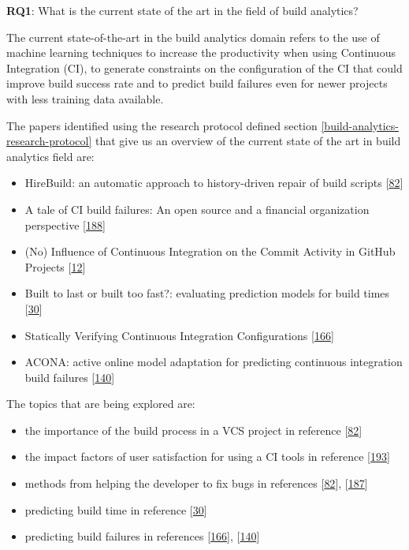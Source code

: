 \documentclass[]{book}
\providecommand{\tightlist}{%
  \setlength{\itemsep}{0pt}\setlength{\parskip}{0pt}}
\begin{document}
\textbf{RQ1}: What is the current state of the art in the field of build
analytics?

The current state-of-the-art in the build analytics domain refers to the
use of machine learning techniques to increase the productivity when
using Continuous Integration (CI), to generate constraints on the
configuration of the CI that could improve build success rate and to
predict build failures even for newer projects with less training data
available.

The papers identified using the research protocol defined section
\ref{build-analytics-research-protocol} that give us an overview of the
current state of the art in build analytics field are:

\begin{itemize}
\tightlist
\item
  HireBuild: an automatic approach to history-driven repair of build
  scripts {[}\protect\hyperlink{ref-hassan2018hirebuild}{82}{]}
\item
  A tale of CI build failures: An open source and a financial
  organization perspective
  {[}\protect\hyperlink{ref-vassallo2017tale}{188}{]}
\item
  (No) Influence of Continuous Integration on the Commit Activity in
  GitHub Projects {[}\protect\hyperlink{ref-baltes2018no}{12}{]}
\item
  Built to last or built too fast?: evaluating prediction models for
  build times {[}\protect\hyperlink{ref-bisong2017built}{30}{]}
\item
  Statically Verifying Continuous Integration Configurations
  {[}\protect\hyperlink{ref-santolucito2018statically}{166}{]}
\item
  ACONA: active online model adaptation for predicting continuous
  integration build failures
  {[}\protect\hyperlink{ref-ni2018acona}{140}{]}
\end{itemize}

The topics that are being explored are:

\begin{itemize}
\tightlist
\item
  the importance of the build process in a VCS project in reference
  {[}\protect\hyperlink{ref-hassan2018hirebuild}{82}{]}
\item
  the impact factors of user satisfaction for using a CI tools in
  reference {[}\protect\hyperlink{ref-widder2018m}{193}{]}
\item
  methods from helping the developer to fix bugs in references
  {[}\protect\hyperlink{ref-hassan2018hirebuild}{82}{]},
  {[}\protect\hyperlink{ref-vassallo2018break}{187}{]}
\item
  predicting build time in reference
  {[}\protect\hyperlink{ref-bisong2017built}{30}{]}
\item
  predicting build failures in references
  {[}\protect\hyperlink{ref-santolucito2018statically}{166}{]},
  {[}\protect\hyperlink{ref-ni2018acona}{140}{]}
\end{itemize}
\end{document}
